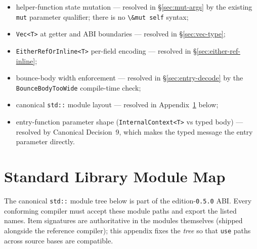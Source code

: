 \documentclass[12pt,oneside]{article}
\begin{document}
\begin{itemize}
\item helper-function state mutation --- resolved in
\S\ref{sec:mut-args} by the existing \verb|mut| parameter qualifier;
there is no \verb|\&mut self| syntax;
\item \verb|Vec<T>| at getter and ABI boundaries --- resolved in
\S\ref{sec:vec-type};
\item \verb|EitherRefOrInline<T>| per-field encoding --- resolved in
\S\ref{sec:either-ref-inline};
\item bounce-body width enforcement --- resolved in
\S\ref{sec:entry-decode} by the \texttt{BounceBodyTooWide} compile-time
check;
\item canonical \verb|std::| module layout --- resolved in
Appendix~\ref{app:stdlib-map} below;
\item entry-function parameter shape (\verb|InternalContext<T>| vs
typed body) --- resolved by Canonical Decision~9, which makes the
typed message the entry parameter directly.
\end{itemize}

\appendix
\section{Standard Library Module Map}
\label{app:stdlib-map}
The canonical \verb|std::| module tree below is part of the
edition-\verb|0.5.0| ABI. Every conforming compiler must accept these module
paths and export the listed names. Item signatures are authoritative in the
modules themselves (shipped alongside the reference compiler); this appendix
fixes the \emph{tree} so that \verb|use| paths across source bases are
compatible.
\end{document}

